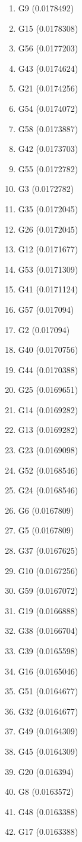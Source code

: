 \begin{enumerate}
\item G9 (0.0178492)
\item G15 (0.0178308)
\item G56 (0.0177203)
\item G43 (0.0174624)
\item G21 (0.0174256)
\item G54 (0.0174072)
\item G58 (0.0173887)
\item G42 (0.0173703)
\item G55 (0.0172782)
\item G3 (0.0172782)
\item G35 (0.0172045)
\item G26 (0.0172045)
\item G12 (0.0171677)
\item G53 (0.0171309)
\item G41 (0.0171124)
\item G57 (0.017094)
\item G2 (0.017094)
\item G40 (0.0170756)
\item G44 (0.0170388)
\item G25 (0.0169651)
\item G14 (0.0169282)
\item G13 (0.0169282)
\item G23 (0.0169098)
\item G52 (0.0168546)
\item G24 (0.0168546)
\item G6 (0.0167809)
\item G5 (0.0167809)
\item G37 (0.0167625)
\item G10 (0.0167256)
\item G59 (0.0167072)
\item G19 (0.0166888)
\item G38 (0.0166704)
\item G39 (0.0165598)
\item G16 (0.0165046)
\item G51 (0.0164677)
\item G32 (0.0164677)
\item G49 (0.0164309)
\item G45 (0.0164309)
\item G20 (0.016394)
\item G8 (0.0163572)
\item G48 (0.0163388)
\item G17 (0.0163388)

\end{enumerate}

